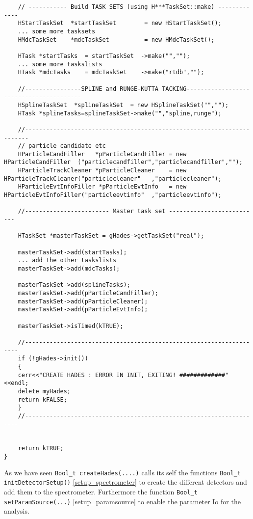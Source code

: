 \begin{lstlisting}
    // ----------- Build TASK SETS (using H***TaskSet::make) -------------
    HStartTaskSet  *startTaskSet        = new HStartTaskSet();
    ... some more tasksets
    HMdcTaskSet    *mdcTaskSet          = new HMdcTaskSet();

    HTask *startTasks  = startTaskSet  ->make("","");
    ... some more taskslists
    HTask *mdcTasks    = mdcTaskSet    ->make("rtdb","");

    //----------------SPLINE and RUNGE-KUTTA TACKING----------------------------------------
    HSplineTaskSet  *splineTaskSet  = new HSplineTaskSet("","");
    HTask *splineTasks=splineTaskSet->make("","spline,runge");

    //-----------------------------------------------------------------------
    // particle candidate etc
    HParticleCandFiller   *pParticleCandFiller = new HParticleCandFiller  ("particlecandfiller","particlecandfiller","");
    HParticleTrackCleaner *pParticleCleaner    = new HParticleTrackCleaner("particlecleaner"   ,"particlecleaner");
    HParticleEvtInfoFiller *pParticleEvtInfo   = new HParticleEvtInfoFiller("particleevtinfo"  ,"particleevtinfo");

    //------------------------ Master task set --------------------------

    HTaskSet *masterTaskSet = gHades->getTaskSet("real");

    masterTaskSet->add(startTasks);
    ... add the other taskslists
    masterTaskSet->add(mdcTasks);

    masterTaskSet->add(splineTasks);
    masterTaskSet->add(pParticleCandFiller);
    masterTaskSet->add(pParticleCleaner);
    masterTaskSet->add(pParticleEvtInfo);

    masterTaskSet->isTimed(kTRUE);

    //--------------------------------------------------------------------
    if (!gHades->init())
    {
	cerr<<"CREATE HADES : ERROR IN INIT, EXITING! #############"<<endl;
	delete myHades;
	return kFALSE;
    }
    //--------------------------------------------------------------------


    return kTRUE;
}
\end{lstlisting}\label{createHades}
\clearpage

As we have seen \verb+Bool_t createHades(....)+ calls its self
the functions  \verb+Bool_t initDetectorSetup()+ \ref{setup_spectrometer}
to create the different detectors and add them to the spectrometer. 
Furthermore the function \verb+Bool_t setParamSource(...)+ \ref{setup_paramsource} 
to enable the parameter Io for the analysis.

